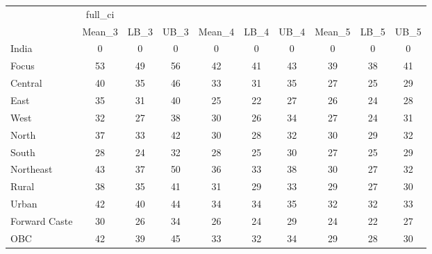 \begin{tabular}{l*{9}{c}}
\toprule
                    &     full\_ci&            &            &            &            &            &            &            &            \\
                    &      Mean\_3&        LB\_3&        UB\_3&      Mean\_4&        LB\_4&        UB\_4&      Mean\_5&        LB\_5&        UB\_5\\
\midrule
India               &           0&           0&           0&           0&           0&           0&           0&           0&           0\\
Focus               &          53&          49&          56&          42&          41&          43&          39&          38&          41\\
Central             &          40&          35&          46&          33&          31&          35&          27&          25&          29\\
East                &          35&          31&          40&          25&          22&          27&          26&          24&          28\\
West                &          32&          27&          38&          30&          26&          34&          27&          24&          31\\
North               &          37&          33&          42&          30&          28&          32&          30&          29&          32\\
South               &          28&          24&          32&          28&          25&          30&          27&          25&          29\\
Northeast           &          43&          37&          50&          36&          33&          38&          30&          27&          32\\
Rural               &          38&          35&          41&          31&          29&          33&          29&          27&          30\\
Urban               &          42&          40&          44&          34&          34&          35&          32&          32&          33\\
Forward Caste       &          30&          26&          34&          26&          24&          29&          24&          22&          27\\
OBC                 &          42&          39&          45&          33&          32&          34&          29&          28&          30\\

\end{tabular}
